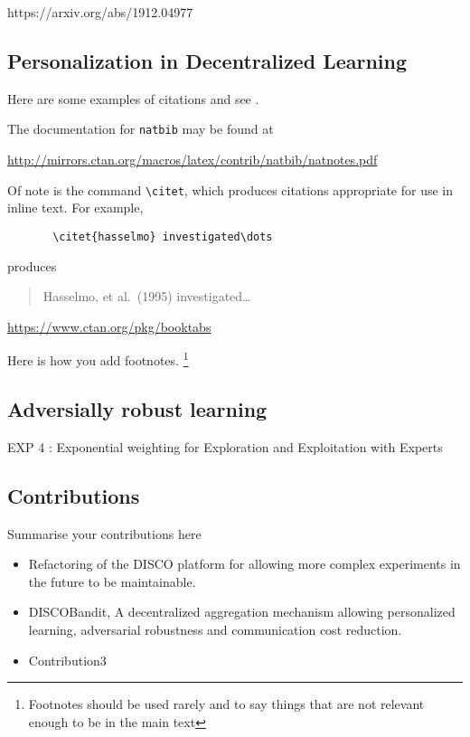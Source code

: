 \documentclass{article}
\begin{document}
https://arxiv.org/abs/1912.04977 
\label{sec:related}
    \subsection{Personalization in Decentralized Learning}
    Here are some examples of citations
    \cite{kour2014real,kour2014fast} and see \cite{hadash2018estimate}.
    
    The documentation for \verb+natbib+ may be found at
    \begin{center}
      \url{http://mirrors.ctan.org/macros/latex/contrib/natbib/natnotes.pdf}
    \end{center}
    
    Of note is the command \verb+\citet+, which produces citations
    appropriate for use in inline text.  For example,
    \begin{verbatim}
       \citet{hasselmo} investigated\dots
    \end{verbatim}
    produces
    \begin{quote}
      Hasselmo, et al.\ (1995) investigated\dots
    \end{quote}
    
    \begin{center}
      \url{https://www.ctan.org/pkg/booktabs}
    \end{center}
    
    Here is how you add footnotes. \footnote{Footnotes should be used rarely and to say things that are not relevant enough to be in the main text}
    
    \subsection{Adversially robust learning}
    EXP 4 : Exponential weighting for Exploration and Exploitation with Experts
    \subsection{Contributions} Summarise your contributions here
    \begin{itemize}
        \item Refactoring of the DISCO platform for allowing more complex experiments in the future to be maintainable.
        \item DISCOBandit, A decentralized aggregation mechanism allowing personalized learning, adversarial robustness and communication cost reduction. 
        \item Contribution3
    \end{itemize}
    
\end{document}
